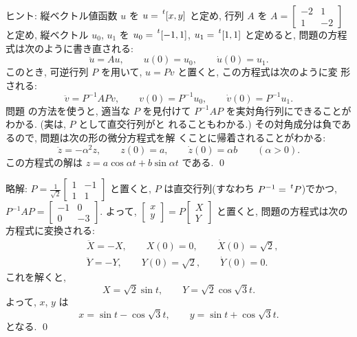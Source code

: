 \documentclass[12pt,twoside]{jarticle}
\newcommand\commentout[1]{#1}
\newcommand\commentout[1]{}
\begin{document}
\noindent
ヒント: 縦ベクトル値函数 $u$ を %
$u=\tp{[x, y]}$ と定め, 行列 $A$ を %
$A=\begin{bmatrix}-2&1\\1&-2\end{bmatrix}$ と定め, 縦ベクトル $u_0$, $u_1$ 
を $u_0=\tp{[-1, 1]}$, $u_1=\tp{[1, 1]}$ と定めると, 
問題の方程式は次のように書き直される:
\begin{equation*}
  \ddot u = Au, \qquad u(0)=u_0, \qquad \dot u(0)=u_1.
\end{equation*}
このとき, 可逆行列 $P$ を用いて, $u=Pv$ と置くと, この方程式は次のように変
形される:
\begin{equation*}
  \ddot v = P^{-1}APv, \qquad v(0)=P^{-1}u_0, \qquad \dot v(0)=P^{-1}u_1.
\end{equation*}
問題  の方法を使うと, 適当な $P$ を見付けて %
$P^{-1}AP$ を実対角行列にできることがわかる. (実は, $P$ として直交行列がと
れることもわかる.) その対角成分は負であるので, 問題は次の形の微分方程式を解
くことに帰着されることがわかる:
\begin{equation*}
  \ddot z = - \alpha^2 z, \qquad z(0)=a, \qquad \dot z(0)= \alpha b
  \qquad (\alpha > 0).
\end{equation*}
この方程式の解は
\( %
  z = a \cos \alpha t + b \sin \alpha t
\) %
である.
\qed

\commentout{
\medskip
\noindent
略解: 
\( \displaystyle %
  P = \frac{1}{\sqrt{2}}
  \begin{bmatrix}
    1 & -1 \\
    1 & 1 
  \end{bmatrix}
\) %
と置くと, $P$ は直交行列(すなわち $P^{-1}=\tp{P}$)でかつ,
\( %
  P^{-1}AP =
  \begin{bmatrix}
    -1 &  0 \\
     0 & -3 
  \end{bmatrix}
\). %
よって,
\( %
  \begin{bmatrix} x \\ y \end{bmatrix} 
  = P \begin{bmatrix} X \\ Y \end{bmatrix} 
\) %
と置くと, 問題の方程式は次の方程式に変換される:
\begin{align*}
  & \ddot X = - X, \qquad X(0) = 0, \qquad \dot X(0) = \sqrt{2},
  \\
  & \ddot Y = - Y, \qquad Y(0) = \sqrt{2}, \qquad \dot Y(0) = 0.
\end{align*}
これを解くと,
\begin{equation*}
  X = \sqrt{2} \sin t, \qquad Y = \sqrt{2} \cos \sqrt{3} t.
\end{equation*}
よって, $x$, $y$ は
\begin{equation*}
  x = \sin t - \cos\sqrt{3}t, 
  \qquad
  y = \sin t + \cos\sqrt{3}t.
\end{equation*}
となる. 
\qed
}
\end{document}
